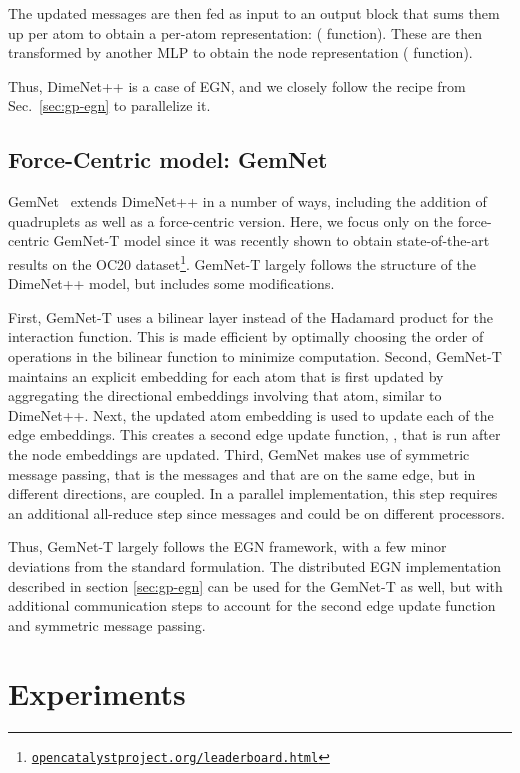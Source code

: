 \documentclass{article} \usepackage{iclr2022_conference,times}
\begin{document}
The updated messages are then fed as input to an output block that sums them up per atom  to obtain a per-atom representation:  ( function). These are then transformed by another MLP to obtain the node representation  ( function).

Thus, DimeNet++ is a case of EGN, and we closely follow the recipe from Sec.~\ref{sec:gp-egn} to parallelize it.

\subsection{Force-Centric model: GemNet}

GemNet~\citep{klicpera2021gemnet} extends DimeNet++ in a number of ways, including the addition of quadruplets as well as a force-centric version. Here, we focus only on the force-centric GemNet-T model since it was recently shown to obtain state-of-the-art results on the OC20 dataset\footnote{{\href{https://opencatalystproject.org/leaderboard.html}{\tt opencatalystproject.org/leaderboard.html}}}. GemNet-T largely follows the structure of the DimeNet++ model, but includes some modifications.

First, GemNet-T uses a bilinear layer instead of the Hadamard product for the interaction function. This is made efficient by optimally choosing the order of operations in the bilinear function to minimize computation. Second, GemNet-T maintains an explicit embedding for each atom that is first updated by aggregating the directional embeddings involving that atom, similar to DimeNet++. Next, the updated atom embedding is used to update each of the edge embeddings. This creates a second edge update function, , that is run after the node embeddings are updated. Third, GemNet makes use of symmetric message passing, that is the messages  and  that are on the same edge, but in different directions, are coupled.
In a parallel implementation, this step requires an additional all-reduce step since messages  and  could be on different processors.

Thus, GemNet-T largely follows the EGN framework, with a few minor deviations from the standard formulation. The distributed EGN implementation described in section \ref{sec:gp-egn} can be used for the GemNet-T as well, but with additional communication steps to account for the second edge update function and symmetric message passing.

\section{Experiments}
\end{document}
